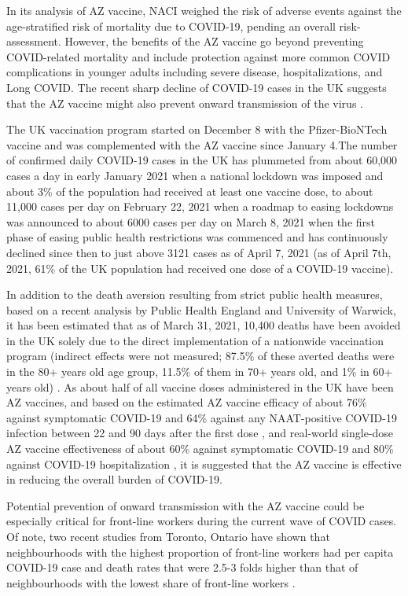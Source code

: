 \documentclass[]{interact}
\theoremstyle{plain}%
\theoremstyle{definition}
\theoremstyle{remark}
\begin{document}
In its analysis of AZ vaccine, NACI weighed the risk of adverse events
against the age-stratified risk of mortality due to COVID-19, pending an
overall risk-assessment. However, the benefits of the AZ vaccine go
beyond preventing COVID-related mortality and include protection against
more common COVID complications in younger adults including severe
disease, hospitalizations, and Long COVID. The recent sharp decline of
COVID-19 cases in the UK suggests that the AZ vaccine might also prevent
onward transmission of the virus
\citep{our_world_in_data_covid-19_2021}.

The UK vaccination program started on December 8 with the
Pfizer-BioNTech vaccine and was complemented with the AZ vaccine since
January 4.The number of confirmed daily COVID-19 cases in the UK has
plummeted from about 60,000 cases a day in early January 2021 when a
national lockdown was imposed and about 3\% of the population had
received at least one vaccine dose, to about 11,000 cases per day on
February 22, 2021 when a roadmap to easing lockdowns was announced to
about 6000 cases per day on March 8, 2021 when the first phase of easing
public health restrictions was commenced \citep{bbc_lockdown_2021} and
has continuously declined since then to just above 3121 cases as of
April 7, 2021 (as of April 7th, 2021, 61\% of the UK population had
received one dose of a COVID-19 vaccine).

In addition to the death aversion resulting from strict public health
measures, based on a recent analysis by Public Health England and
University of Warwick, it has been estimated that as of March 31, 2021,
10,400 deaths have been avoided in the UK solely due to the direct
implementation of a nationwide vaccination program (indirect effects
were not measured; 87.5\% of these averted deaths were in the 80+ years
old age group, 11.5\% of them in 70+ years old, and 1\% in 60+ years
old) \citep{public_health_england_impact_2021}. As about half of all
vaccine doses administered in the UK have been AZ vaccines, and based on
the estimated AZ vaccine efficacy of about 76\% against symptomatic
COVID-19 and 64\% against any NAAT-positive COVID-19 infection between
22 and 90 days after the first dose \citep{voysey_single-dose_2021}, and
real-world single-dose AZ vaccine effectiveness of about 60\% against
symptomatic COVID-19 and 80\% against COVID-19 hospitalization
\citep{public_health_england_1public_2021}, it is suggested that the AZ
vaccine is effective in reducing the overall burden of COVID-19.

Potential prevention of onward transmission with the AZ vaccine could be
especially critical for front-line workers during the current wave of
COVID cases. Of note, two recent studies from Toronto, Ontario have
shown that neighbourhoods with the highest proportion of front-line
workers had per capita COVID-19 case and death rates that were 2.5-3
folds higher than that of neighbourhoods with the lowest share of
front-line workers
\citep[\citet{rao_disproportionate_2021}]{chagla_characterizing_2021}.
\end{document}
